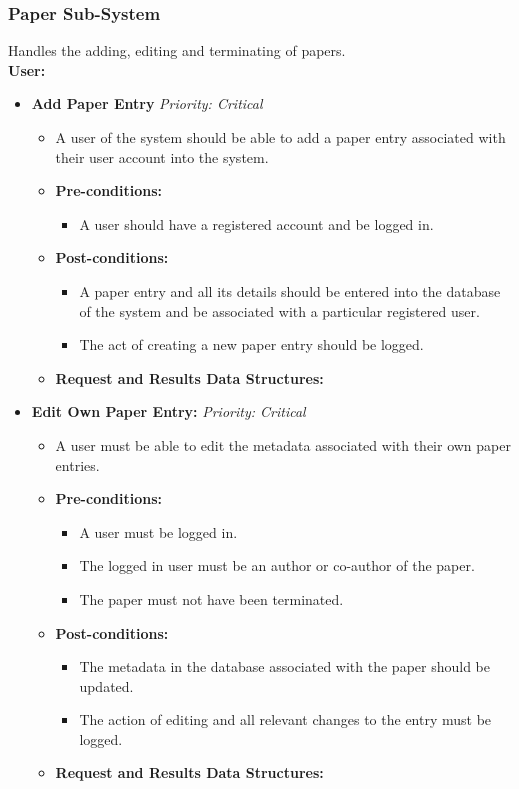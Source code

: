 \documentclass{article}
\begin{document}
			\subsubsection{Paper Sub-System}\label{subsubsec:service-paper}
				Handles the adding, editing and terminating of papers.\\
				[3mm]
				\textbf{User:}
				\begin{itemize}
					\item \textbf{Add Paper Entry} \hfill \textit{Priority: Critical}
					\begin{itemize}
						\item A user of the system should be able to add a paper entry associated with their user account into the system.
						\item \textbf{Pre-conditions:}
						\begin{itemize}
							\item A user should have a registered account and be logged in.
						\end{itemize}
						\item \textbf{Post-conditions:}
						\begin{itemize}
							\item A paper entry and all its details should be entered into the database of the system and be associated with a particular registered user.
							\item The act of creating a new paper entry should be logged.
						\end{itemize}
						\item \textbf{Request and Results Data Structures:}
					\end{itemize}
					
					\item \textbf{Edit Own Paper Entry:} \hfill \textit{Priority: Critical}
					\begin{itemize}
						\item A user must be able to edit the metadata associated with their own paper entries.
						\item \textbf{Pre-conditions:}
						\begin{itemize}
							\item A user must be logged in.
							\item The logged in user must be an author or co-author of the paper.
							\item The paper must not have been terminated.
						\end{itemize}
						\item \textbf{Post-conditions:}
						\begin{itemize}
							\item The metadata in the database associated with the paper should be updated.
							\item The action of editing and all relevant changes to the entry must be logged.
						\end{itemize}
						\item \textbf{Request and Results Data Structures:}
					\end{itemize}
					

\end{itemize}
\end{document}
